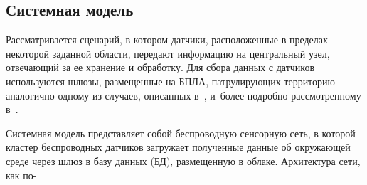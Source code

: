 \begin{multicols}{2}
\vspace*{-6pt}
  
\section{Системная модель}

\vspace*{-3pt}

  Рассматривается сценарий, в котором датчики, расположенные в пределах некоторой 
заданной области, передают информацию на центральный узел, отвечающий за ее 
хранение и обработку. Для сбора данных с датчиков используются шлюзы, размещенные 
на БПЛА, патрулирующих территорию аналогично одному из случаев, описанных 
в~\cite{7-al}, и~более подробно рассмотренному в~\cite{8-al}.
  



  Системная модель представляет собой беспроводную сенсорную сеть, в которой 
кластер беспроводных датчиков загружает полученные данные об окружающей среде 
через шлюз в базу данных (БД), размещенную в облаке. Архитектура сети, как по-\linebreak\vspace*{-12pt}

\pagebreak

\end{multicols}

\begin{figure*} %
\vspace*{1pt}
  \begin{center}  
    \mbox{%
\epsfxsize=163mm
}

\end{center}
\vspace*{-6pt}
\end{figure*}


